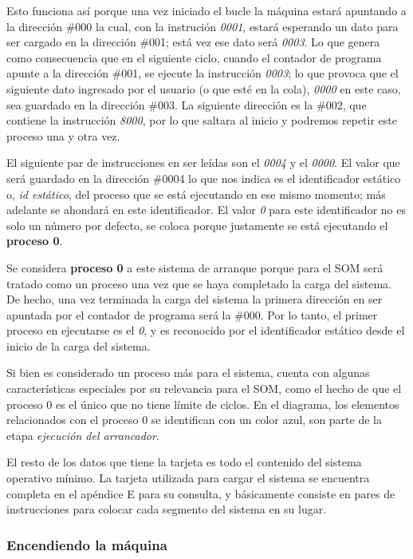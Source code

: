 \documentclass[letterpaper,12pt,oneside]{book}
\begin{document}
		Esto funciona así porque una vez iniciado el bucle
		la máquina estará apuntando a la dirección \#000 la cual, con la instrución \textit{0001}, estará esperando un dato para
		ser cargado en la dirección \#001; está vez ese dato será \textit{0003}. Lo que genera como consecuencia que en el siguiente
		ciclo, cuando el contador de programa apunte a la dirección \#001, se ejecute la instrucción \textit{0003}; lo que provoca que el siguiente
		dato ingresado por el usuario (o que esté en la cola), \textit{0000} en este caso, sea guardado en la dirección \#003. La siguiente dirección
		es la \#002, que contiene la instrucción \textit{8000}, por lo que saltara al inicio y podremos repetir este proceso una y otra vez.
		
		
		El siguiente par de instrucciones en ser leídas son el \textit{0004} y el \textit{0000}.
		El valor que será guardado en la dirección \#0004 
		 lo que nos indica es el identificador estático o, \textit{id 
		estático}, del proceso
		que se está ejecutando en ese mismo momento; más adelante se ahondará en este identificador.
		 El valor \textit{0} para este identificador no es solo un número por defecto, se coloca porque 
		justamente se está ejecutando el 
		\textbf{proceso 0}. 
  
		Se considera \textbf{proceso 0} a este sistema de arranque  porque para el SOM  será tratado como un proceso una vez que se haya completado la carga
		del sistema. De hecho, una vez terminada la carga del sistema
		la primera dirección en ser apuntada por el contador de programa será la \#000. Por lo tanto, el primer proceso en
		ejecutarse es el \textit{0}, y es reconocido por el identificador estático desde el inicio de la carga del sistema.
	    
	    Si bien es considerado un proceso más para el sistema, cuenta con algunas características especiales por su relevancia
	    para el SOM, como el hecho de que el proceso 0 es el único que no tiene límite de ciclos.
	     En el diagrama, los elementos relacionados con el proceso 0 se identifican con un color azul, son parte de la etapa  
	    \textit{ejecución del 
	    arrancador}.
		
		El resto de los datos que tiene la tarjeta es todo el contenido  del sistema operativo mínimo. La tarjeta utilizada para cargar el sistema
		se encuentra completa en el apéndice E para su consulta, y básicamente consiste en pares de instrucciones para colocar cada segmento
		del sistema en su lugar.
		
		\subsubsection{Encendiendo la máquina}
		
\end{document}
